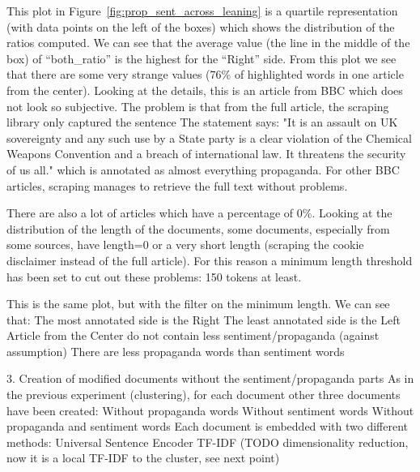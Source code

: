 This plot in Figure~\ref{fig:prop_sent_across_leaning} is a quartile representation (with data points on the left of the boxes) which shows the distribution of the ratios computed. We can see that the average value (the line in the middle of the box) of “both\_ratio” is the highest for the “Right” side.
From this plot we see that there are some very strange values (76\% of highlighted words in one article from the center). Looking at the details, this is an article from BBC which does not look so subjective. The problem is that from the full article, the scraping library only captured the sentence The statement says: "It is an assault on UK sovereignty and any such use by a State party is a clear violation of the Chemical Weapons Convention and a breach of international law. It threatens the security of us all." which is annotated as almost everything propaganda. For other BBC articles, scraping manages to retrieve the full text without problems.

There are also a lot of articles which have a percentage of 0\%. Looking at the distribution of the length of the documents, some documents, especially from some sources, have length=0 or a very short length (scraping the cookie disclaimer instead of the full article).
For this reason a minimum length threshold has been set to cut out these problems: 150 tokens at least.

This is the same plot, but with the filter on the minimum length.
We can see that:
The most annotated side is the Right
The least annotated side is the Left
Article from the Center do not contain less sentiment/propaganda (against assumption)
There are less propaganda words than sentiment words



3. Creation of modified documents without the sentiment/propaganda parts
As in the previous experiment (clustering), for each document other three documents have been created:
Without propaganda words
Without sentiment words
Without propaganda and sentiment words
Each document is embedded with two different methods:
Universal Sentence Encoder
TF-IDF (TODO dimensionality reduction, now it is a local TF-IDF to the cluster, see next point)


